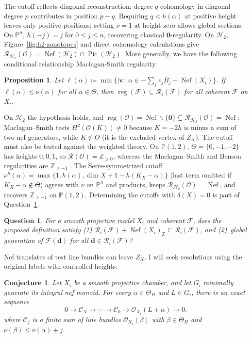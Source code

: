 \documentclass[11pt,reqno]{amsart}
\newtheorem{prop}[lemma]{Proposition}
\newtheorem{conjecture}[lemma]{Conjecture}
\newtheorem{question}[lemma]{Question}
\theoremstyle{remark}
\newcommand{\reg}{\operatorname{reg}}
\newcommand{\Pic}{\operatorname{Pic}}
\newcommand{\Nef}{\operatorname{Nef}}
\newcommand{\dd}{\mathbf{d}}
\newcommand{\vv}{\mathbf{v}}
\newcommand{\zero}{\mathbf{0}}
\newcommand{\PP}{\mathbb{P}}
\newcommand{\ZZ}{\mathbb{Z}}
\newcommand{\cC}{\mathcal{C}}
\newcommand{\cF}{\mathcal{F}}
\newcommand{\cH}{\mathcal{H}}
\newcommand{\cO}{\mathcal{O}}
\newcommand{\cR}{\mathcal{R}}
\begin{document}
The cutoff reflects diagonal reconstruction: degree-$q$ cohomology in diagonal degree $p$ contributes in position $p-q$. Requiring $q<h(\alpha)$ at positive height leaves only positive positions; setting $\nu=1$ at height zero allows global sections. On $\PP^n$, $h(-j)=j$ for $0\leq j\leq n$, recovering classical $\zero$-regularity. On $\cH_2$, Figure~\ref{fig:h2-zonotopes} and direct cohomology calculations give $\cR_{\cH_2}(\cO)=\Nef(\cH_2)\cap\Pic(\cH_2)$. More generally, we have the following conditional relationship Maclagan-Smith regularity.


\begin{prop}\label{prop:ms-compare}
Let $\ell(\alpha)\coloneqq\min\{|\vv|:\alpha\in-\sum_jv_jB_j+\Nef(X_i)\}$. If $\ell(\alpha)\le\nu(\alpha)$ for all $\alpha\in\Theta$, then $\reg(\cF)\subseteq\cR_i(\cF)$ for all coherent $\cF$ on $X_i$.
\end{prop}
On $\cH_2$ the hypothesis holds, and $\reg(\cO)=\Nef\smallsetminus\{\zero\}\subsetneq\cR_{\cH_2}(\cO)=\Nef$: Maclagan--Smith tests $H^2(\cO(K))\neq0$ because $K=-2h$ is minus a sum of two nef generators, while $K\notin\Theta$ (it is the excluded vertex of $Z_X$). The cutoff must also be tested against the weighted theory. On $\PP(1,2)$, $\Theta=\{0,-1,-2\}$ has heights $0,0,1$, so $\cR(\cO)=\ZZ_{\ge0}$, whereas the Maclagan--Smith and Benson regularities are $\ZZ_{\ge-1}$ \cite{benson04}. The Serre-symmetrized cutoff $\nu^S(\alpha)=\max\{1,h(\alpha),\dim X+1-h(K_X-\alpha)\}$ (last term omitted if $K_X-\alpha\notin\Theta$) agrees with $\nu$ on $\PP^n$ and products, keeps $\cR_{\cH_2}(\cO)=\Nef$, and recovers $\ZZ_{\ge-1}$ on $\PP(1,2)$. Determining the cutoffs with $\delta(X)=0$ is part of Question~\ref{q:cox-regularity-tests}.


\begin{question}\label{q:cox-regularity-tests}
For a smooth projective model $X_i$ and coherent $\cF$, does the proposed definition satisfy (1) $\cR_i(\cF)+\Nef(X_i)_{\ZZ}\subseteq\cR_i(\cF)$, and (2)~\emph{global generation} of $\cF(\dd)$ for all $\dd\in\cR_i(\cF)$?
\end{question}

Nef translates of test line bundles can leave $Z_X$. I will seek resolutions using the original labels with controlled heights:
\begin{conjecture}\label{conj:cox-nef-resolutions}
Let $X_i$ be a smooth projective chamber, and let $G_i$ minimally generate its integral nef monoid. For every $\alpha\in\Theta_H$ and $L\in G_i$, there is an exact sequence
\[
 0\longrightarrow\cC_N\longrightarrow\cdots\longrightarrow\cC_0
 \longrightarrow\cO_{X_i}(L+\alpha)\longrightarrow0,
\]
where $\cC_j$ is a finite sum of line bundles $\cO_{X_i}(\beta)$ with $\beta\in\Theta_H$ and $\nu(\beta)\leq\nu(\alpha)+j$.
\end{conjecture}
\end{document}
